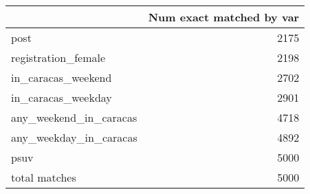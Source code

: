 \begin{tabular}{lr}
\toprule
{} &  Num exact matched by var \\
\midrule
post                   &                      2175 \\
registration\_female    &                      2198 \\
in\_caracas\_weekend     &                      2702 \\
in\_caracas\_weekday     &                      2901 \\
any\_weekend\_in\_caracas &                      4718 \\
any\_weekday\_in\_caracas &                      4892 \\
psuv                   &                      5000 \\
total matches          &                      5000 \\
\bottomrule
\end{tabular}
